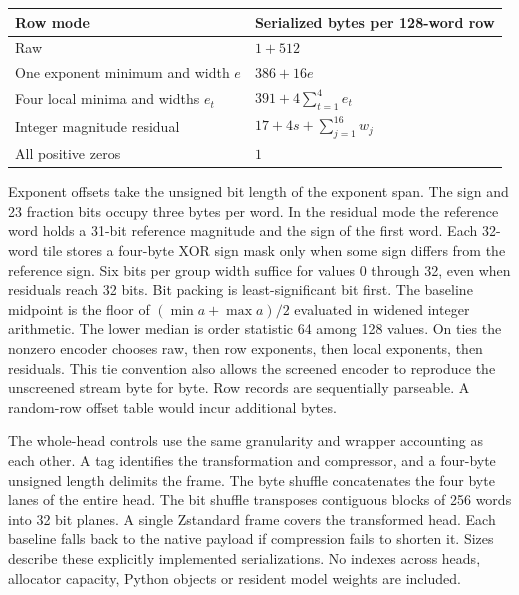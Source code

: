 \begin{center}\small
\begin{tabular}{ll}\toprule
Row mode & Serialized bytes per 128-word row \\ \midrule
Raw & $1+512$ \\
One exponent minimum and width $e$ & $386+16e$ \\
Four local minima and widths $e_t$ & $391+4\sum_{t=1}^4e_t$ \\
Integer magnitude residual & $17+4s+\sum_{j=1}^{16}w_j$ \\
All positive zeros & $1$ \\ \bottomrule
\end{tabular}
\end{center}
Exponent offsets take the unsigned bit length of the exponent span. The sign and 23 fraction bits occupy three bytes per word. In the residual mode the reference word holds a 31-bit reference magnitude and the sign of the first word. Each 32-word tile stores a four-byte XOR sign mask only when some sign differs from the reference sign. Six bits per group width suffice for values 0 through 32, even when residuals reach 32 bits. Bit packing is least-significant bit first. The baseline midpoint is the floor of $(\min a+\max a)/2$ evaluated in widened integer arithmetic. The lower median is order statistic 64 among 128 values. On ties the nonzero encoder chooses raw, then row exponents, then local exponents, then residuals. This tie convention also allows the screened encoder to reproduce the unscreened stream byte for byte. Row records are sequentially parseable. A random-row offset table would incur additional bytes.

The whole-head controls use the same granularity and wrapper accounting as each other. A tag identifies the transformation and compressor, and a four-byte unsigned length delimits the frame. The byte shuffle concatenates the four byte lanes of the entire head. The bit shuffle transposes contiguous blocks of 256 words into 32 bit planes. A single Zstandard frame covers the transformed head. Each baseline falls back to the native payload if compression fails to shorten it. Sizes describe these explicitly implemented serializations. No indexes across heads, allocator capacity, Python objects or resident model weights are included.

